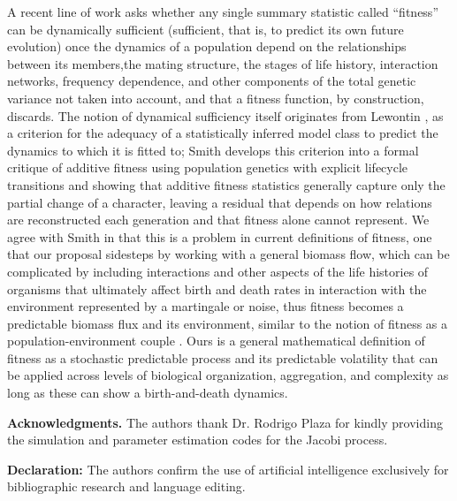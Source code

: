 \documentclass[12pt]{article}
\begin{document}
A recent line of work \cite{smith2023beyond} asks whether any single summary statistic called “fitness” can be dynamically sufficient (sufficient, that is, to predict its own future evolution) once the dynamics of a population depend on the relationships between its members,the mating structure, the stages of life history, interaction networks, frequency dependence, and other components of the total genetic variance not taken into account, and that a fitness function, by construction, discards. The notion of dynamical sufficiency itself originates from Lewontin \cite{lewontin1974genetic}, as a criterion for the adequacy of a statistically inferred model class to predict the dynamics to which it is fitted to; Smith \cite{smith2023beyond} develops this criterion into a formal critique of additive fitness using population genetics with explicit lifecycle transitions and showing that additive fitness statistics generally capture only the partial change of a character, leaving a residual that depends on how relations are reconstructed each generation and that fitness alone cannot represent. We agree with Smith in that this is a problem in current definitions of fitness, one that our proposal sidesteps by working with a general biomass flow, which can be complicated by including interactions and other aspects of the life histories of organisms that ultimately affect birth and death rates in interaction with the environment represented by a martingale or noise, thus fitness becomes a predictable biomass flux and its environment, similar to the notion of fitness as a population-environment couple \cite{abrams2023evolution}. Ours is a general mathematical definition of fitness as a stochastic predictable process and its predictable volatility that can be applied across levels of biological organization, aggregation, and complexity as long as these can show a birth-and-death dynamics.

\vskip 20pt
\textbf{Acknowledgments.} The authors thank Dr. Rodrigo Plaza for kindly providing the simulation and parameter estimation codes for the Jacobi process.

\textbf{Declaration:} The authors confirm the use of artificial intelligence exclusively for bibliographic research and language editing.
\vskip 20pt


\end{document}

